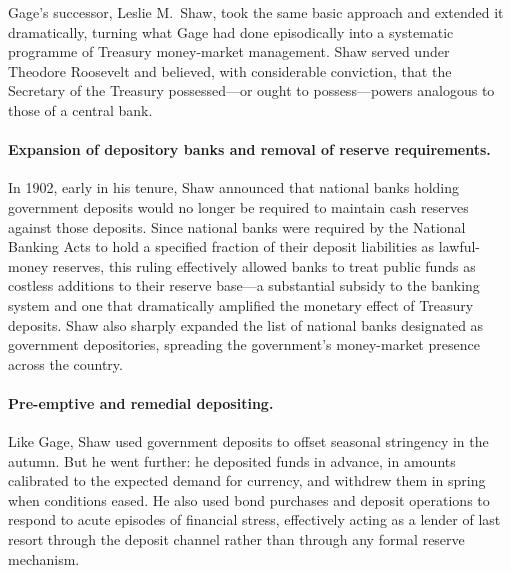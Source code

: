 \documentclass[12pt]{article}
\begin{document}
Gage's successor, Leslie M.\ Shaw, took the same basic approach and
extended it dramatically, turning what Gage had done episodically into
a systematic programme of Treasury money-market management.  Shaw
served under Theodore Roosevelt and believed, with considerable
conviction, that the Secretary of the Treasury possessed---or ought to
possess---powers analogous to those of a central bank.

\paragraph{Expansion of depository banks and removal of reserve
requirements.}
In 1902, early in his tenure, Shaw announced that national banks
holding government deposits would no longer be required to maintain
cash reserves against those deposits.  Since national banks were
required by the National Banking Acts to hold a specified fraction of
their deposit liabilities as lawful-money reserves, this ruling
effectively allowed banks to treat public funds as costless additions
to their reserve base---a substantial subsidy to the banking system
and one that dramatically amplified the monetary effect of Treasury
deposits.  Shaw also sharply expanded the list of national banks
designated as government depositories, spreading the government's
money-market presence across the country.

\paragraph{Pre-emptive and remedial depositing.}
Like Gage, Shaw used government deposits to offset seasonal stringency
in the autumn.  But he went further: he deposited funds in advance,
in amounts calibrated to the expected demand for currency, and
withdrew them in spring when conditions eased.  He also used bond
purchases and deposit operations to respond to acute episodes of
financial stress, effectively acting as a lender of last resort
through the deposit channel rather than through any formal reserve
mechanism.
\end{document}
